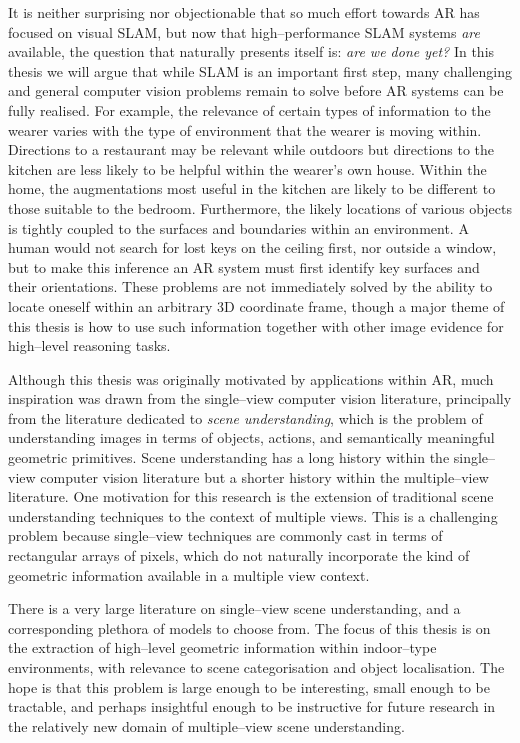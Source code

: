 It is neither surprising nor objectionable that so much effort towards
AR has focused on visual SLAM, but now that high--performance SLAM
systems \textit{are} available, the question that naturally presents
itself is: \textit{are we done yet?} In this thesis we will argue that
while SLAM is an important first step, many challenging and general
computer vision problems remain to solve before AR systems can be
fully realised. For example, the relevance of certain types of
information to the wearer varies with the type of environment that the
wearer is moving within. Directions to a restaurant may be relevant
while outdoors but directions to the kitchen are less likely to be
helpful within the wearer's own house. Within the home, the
augmentations most useful in the kitchen are likely to be different to
those suitable to the bedroom. Furthermore, the likely locations of
various objects is tightly coupled to the surfaces and boundaries
within an environment. A human would not search for lost keys on the
ceiling first, nor outside a window, but to make this inference an AR
system must first identify key surfaces and their orientations. These
problems are not immediately solved by the ability to locate oneself
within an arbitrary 3D coordinate frame, though a major theme of this
thesis is how to use such information together with other image
evidence for high--level reasoning tasks.

Although this thesis was originally motivated by applications within
AR, much inspiration was drawn from the single--view computer vision
literature, principally from the literature dedicated to \textit{scene
  understanding}, which is the problem of understanding images in
terms of objects, actions, and semantically meaningful geometric
primitives. Scene understanding has a long history within the
single--view computer vision literature but a shorter history within
the multiple--view literature. One motivation for this
research is the extension of traditional scene understanding
techniques to the context of multiple views. This is a challenging
problem because single--view techniques are commonly cast in terms of
rectangular arrays of pixels, which do not naturally incorporate the
kind of geometric information available in a multiple view context.

There is a very large literature on single--view scene understanding, and a
corresponding plethora of models to choose from. The focus of this
thesis is on the extraction of high--level geometric information
within indoor--type environments, with relevance to scene
categorisation and object localisation. The hope is that this problem
is large enough to be interesting, small enough to be tractable, and
perhaps insightful enough to be instructive for future research in
the relatively new domain of multiple--view scene understanding.

